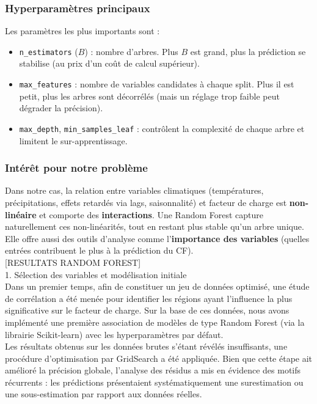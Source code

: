 \documentclass{article}
\theoremstyle{nopointbreak}
\theoremstyle{nobrkbold}
\begin{document}
\subsubsection{Hyperparamètres principaux}
Les paramètres les plus importants sont :
\begin{itemize}
    \item \texttt{n\_estimators} ($B$) : nombre d’arbres. Plus $B$ est grand, plus la prédiction se stabilise (au prix d’un coût de calcul supérieur).
    \item \texttt{max\_features} : nombre de variables candidates à chaque split. Plus il est petit, plus les arbres sont décorrélés (mais un réglage trop faible peut dégrader la précision).
    \item \texttt{max\_depth}, \texttt{min\_samples\_leaf} : contrôlent la complexité de chaque arbre et limitent le sur-apprentissage.
\end{itemize}

\subsubsection{Intérêt pour notre problème}
Dans notre cas, la relation entre variables climatiques (températures, précipitations, effets retardés via lags, saisonnalité) et facteur de charge est \textbf{non-linéaire} et comporte des \textbf{interactions}. Une Random Forest capture naturellement ces non-linéarités, tout en restant plus stable qu’un arbre unique. Elle offre aussi des outils d’analyse comme l’\textbf{importance des variables} (quelles entrées contribuent le plus à la prédiction du CF). \\

[RESULTATS RANDOM FOREST]\\

1. Sélection des variables et modélisation initiale \\
Dans un premier temps, afin de constituer un jeu de données optimisé, une étude de corrélation a été menée pour identifier les régions ayant l'influence la plus significative sur le facteur de charge. Sur la base de ces données, nous avons implémenté une première association de modèles de type Random Forest (via la librairie Scikit-learn) avec les hyperparamètres par défaut.\\
Les résultats obtenus sur les données brutes s'étant révélés insuffisants, une procédure d'optimisation par GridSearch a été appliquée. Bien que cette étape ait amélioré la précision globale, l'analyse des résidus a mis en évidence des motifs récurrents : les prédictions présentaient systématiquement une surestimation ou une sous-estimation par rapport aux données réelles.\\
\end{document}
